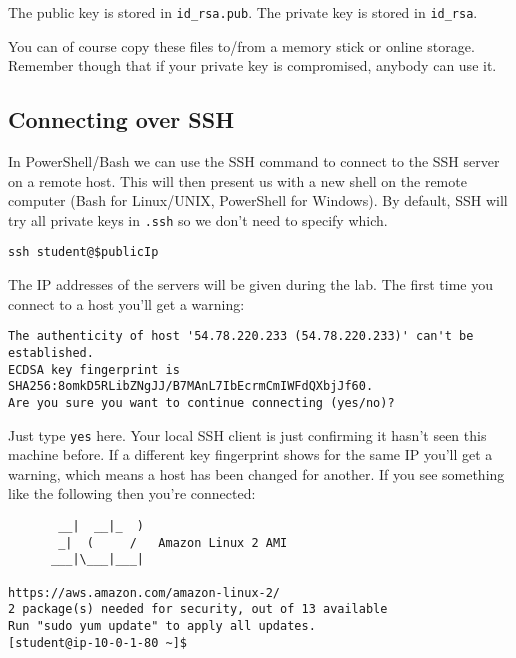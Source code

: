 The public key is stored in \texttt{id\_rsa.pub}.
The private key is stored in \texttt{id\_rsa}.

You can of course copy these files to/from a memory stick or online storage.
Remember though that if your private key is compromised,
anybody can use it.

\subsection{Connecting over SSH}
\label{connecting-over-ssh}

In PowerShell/Bash we can use the SSH command to connect to the SSH server on a remote host.
This will then present us with a new shell on the remote computer (Bash for Linux/UNIX, PowerShell for Windows).
By default, SSH will try all private keys in \texttt{.ssh} so we don't need to specify which.

\begin{verbatim}
ssh student@$publicIp 
\end{verbatim}

The IP addresses of the servers will be given during the lab.
The first time you connect to a host you'll get a warning:

\begin{verbatim}
The authenticity of host '54.78.220.233 (54.78.220.233)' can't be established.
ECDSA key fingerprint is SHA256:8omkD5RLibZNgJJ/B7MAnL7IbEcrmCmIWFdQXbjJf60.
Are you sure you want to continue connecting (yes/no)?
\end{verbatim}

Just type \texttt{yes} here.
Your local SSH client is just confirming it hasn't seen this machine before.
If a different key fingerprint shows for the same IP you'll get a warning, which means a host has been changed for another.
If you see something like the following then you're connected:

\begin{verbatim}
       __|  __|_  )
       _|  (     /   Amazon Linux 2 AMI
      ___|\___|___|

https://aws.amazon.com/amazon-linux-2/
2 package(s) needed for security, out of 13 available
Run "sudo yum update" to apply all updates.
[student@ip-10-0-1-80 ~]$
\end{verbatim}


